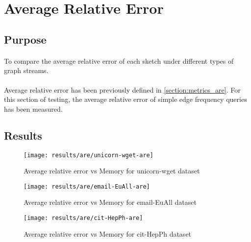 \section{Average Relative Error}
\label{section:results_are}

\subsection*{Purpose}

\paragraph{}
To compare the average relative error of each sketch under different types of graph streams.

\paragraph{}
Average relative error has been previously defined in \autoref{section:metrics_are}. For this section of testing, the average relative error of simple edge frequency queries has been measured.

\subsection*{Results}

\begin{figure}[H]
    \centering \texttt{[image: results/are/unicorn-wget-are]}
    \vspace{-0.5cm}
    \caption{Average relative error vs Memory for unicorn-wget dataset}
    \label{fig:unicorn-wget-are}
\end{figure}

\begin{figure}[H]
    \centering \texttt{[image: results/are/email-EuAll-are]}
    \vspace{-0.5cm}
    \caption{Average relative error vs Memory for email-EuAll dataset}
    \label{fig:email-EuAll-are}
\end{figure}

\begin{figure}[H]
    \centering \texttt{[image: results/are/cit-HepPh-are]}
    \vspace{-0.5cm}
    \caption{Average relative error vs Memory for cit-HepPh dataset}
    \label{fig:cit-HepPh-are}
\end{figure}

